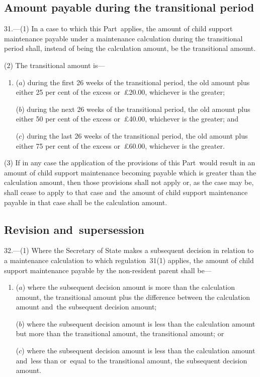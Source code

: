 \documentclass[12pt,a4paper]{article}
\begin{document}

\subsection[31. Amount payable during the transitional period]{Amount payable during the transitional period}

31.---(1)  In a case to which this Part~applies, the amount of child support maintenance payable under a maintenance calculation during the transitional period shall, instead of being the calculation amount, be the transitional amount.

(2) The transitional amount is—
\begin{enumerate}\item[]
($a$) during the first 26 weeks of the transitional period, the old amount plus either 25 per cent of the excess or~£20$.$00, whichever is the greater;

($b$) during the next 26 weeks of the transitional period, the old amount plus either 50 per cent of the excess or~£40$.$00, whichever is the greater; and

($c$) during the last 26 weeks of the transitional period, the old amount plus either 75 per cent of the excess or~£60$.$00, whichever is the greater.
\end{enumerate}

(3) If in any case the application of the provisions of this Part~would result in an amount of child support maintenance becoming payable which is greater than the calculation amount, then those provisions shall not apply or, as the case may be, shall cease to apply to that case and~the amount of child support maintenance payable in that case shall be the calculation amount.

\subsection[32. Revision and~supersession]{Revision and~supersession
}

32.---(1)  Where the Secretary of State makes a subsequent decision in relation to a maintenance calculation to which regulation~31(1) applies, the amount of child support maintenance payable by the non-resident parent shall be—
\begin{enumerate}\item[]
($a$) where the subsequent decision amount is more than the calculation amount, the transitional amount plus the difference between the calculation amount and~the subsequent decision amount;

($b$) where the subsequent decision amount is less than the calculation amount but more than the transitional amount, the transitional amount; or

($c$) where the subsequent decision amount is less than the calculation amount and~less than or~equal to the transitional amount, the subsequent decision amount.
\end{enumerate}
\end{document}
